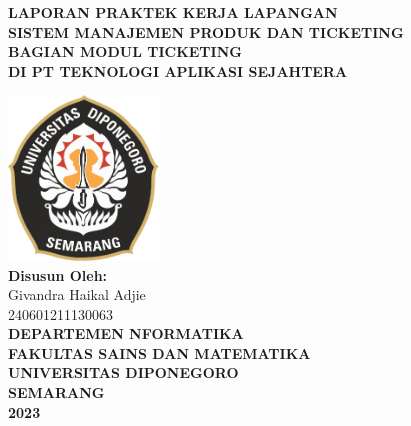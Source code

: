 \documentclass[12pt]{article}
\begin{document}
\begin{titlepage}
    \begin{center}
        {
            \textbf{ LAPORAN PRAKTEK KERJA LAPANGAN} \\
            \textbf{SISTEM MANAJEMEN PRODUK DAN TICKETING}\\
            \textbf{ BAGIAN MODUL TICKETING} \\
            \textbf{DI PT TEKNOLOGI APLIKASI SEJAHTERA} \\
        }

        \vfill
        \includegraphics[width=4cm]{images/logo-undip.png} \\
        \vfill
        \textbf{ Disusun Oleh:} \\
        Givandra Haikal Adjie \\
        240601211130063 \\

        \vspace{1cm}
        \textbf{
        DEPARTEMEN NFORMATIKA \\
        FAKULTAS SAINS DAN MATEMATIKA \\
        UNIVERSITAS DIPONEGORO \\
        SEMARANG \\
        2023}

    \end{center}
\end{titlepage}
\end{document}
